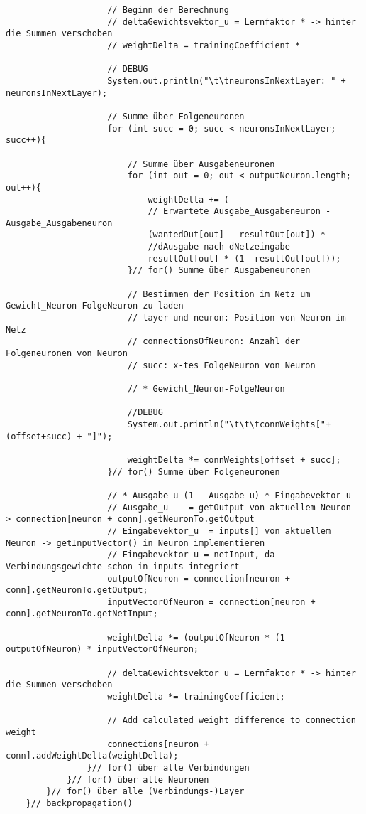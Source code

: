 \begin{lstlisting}
					// Beginn der Berechnung
					// deltaGewichtsvektor_u = Lernfaktor * -> hinter die Summen verschoben
					// weightDelta = trainingCoefficient * 
					
					// DEBUG
					System.out.println("\t\tneuronsInNextLayer: " + neuronsInNextLayer);
					
					// Summe über Folgeneuronen
					for (int succ = 0; succ < neuronsInNextLayer; succ++){
						
						// Summe über Ausgabeneuronen
						for (int out = 0; out < outputNeuron.length; out++){
							weightDelta += (
							// Erwartete Ausgabe_Ausgabeneuron - Ausgabe_Ausgabeneuron
							(wantedOut[out] - resultOut[out]) *
							//dAusgabe nach dNetzeingabe
							resultOut[out] * (1- resultOut[out]));
						}// for() Summe über Ausgabeneuronen
						
						// Bestimmen der Position im Netz um Gewicht_Neuron-FolgeNeuron zu laden
						// layer und neuron: Position von Neuron im Netz
						// connectionsOfNeuron: Anzahl der Folgeneuronen von Neuron
						// succ: x-tes FolgeNeuron von Neuron
						
						// * Gewicht_Neuron-FolgeNeuron
						
						//DEBUG
						System.out.println("\t\t\tconnWeights["+ (offset+succ) + "]");
						
						weightDelta *= connWeights[offset + succ];
					}// for() Summe über Folgeneuronen
					
					// * Ausgabe_u (1 - Ausgabe_u) * Eingabevektor_u
					// Ausgabe_u	= getOutput von aktuellem Neuron -> connection[neuron + conn].getNeuronTo.getOutput
					// Eingabevektor_u	= inputs[] von aktuellem Neuron -> getInputVector() in Neuron implementieren
					// Eingabevektor_u = netInput, da Verbindungsgewichte schon in inputs integriert
					outputOfNeuron = connection[neuron + conn].getNeuronTo.getOutput;
					inputVectorOfNeuron = connection[neuron + conn].getNeuronTo.getNetInput;
					
					weightDelta *= (outputOfNeuron * (1 - outputOfNeuron) * inputVectorOfNeuron;
					
					// deltaGewichtsvektor_u = Lernfaktor * -> hinter die Summen verschoben
					weightDelta *= trainingCoefficient;
					
					// Add calculated weight difference to connection weight
					connections[neuron + conn].addWeightDelta(weightDelta);
				}// for() über alle Verbindungen
			}// for() über alle Neuronen
		}// for() über alle (Verbindungs-)Layer
	}// backpropagation()
\end{lstlisting}
